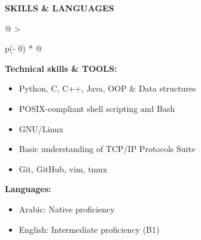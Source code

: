 \documentclass[a4paper]{article}
\begin{document}
\textbf{SKILLS \& LANGUAGES}
\vspace{-8pt}
\nopagebreak[4]
\begin{longtable}[]{@{}
  >{\raggedright\arraybackslash}p{(\columnwidth - 0\tabcolsep) * }@{}}
\toprule\noalign{}
\vspace{0pt}
\begin{minipage}[t]{\linewidth}\raggedright
    \textbf{Technical skills \& TOOLS:}
    \begin{itemize}
        \item
          Python, C, C++, Java, OOP \& Data structures
        \item
          POSIX-compliant shell scripting and Bash
        \item
          GNU/Linux
        \item
          Basic understanding of TCP/IP Protocols Suite
        \item
          Git, GitHub, vim, tmux
    \end{itemize}

    \textbf{Languages:}
    \begin{itemize}
        \item
          Arabic: Native proficiency
        \item
          English: Intermediate proficiency (B1)
    \end{itemize}
\end{minipage} \\
\end{longtable}
\vspace{-10pt}
\end{document}
